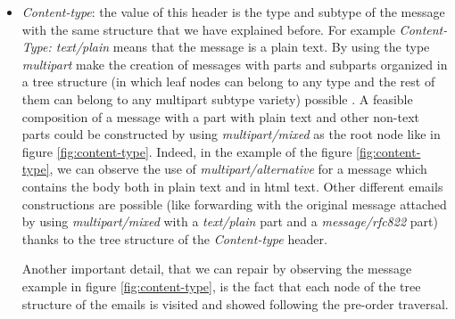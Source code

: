 \begin{itemize}
	\item\textit{Content-type}: the value of this header is the type and subtype of the message with the same structure that we have explained before. For example \textit{Content-Type: text/plain} means that the message is a plain text. By using the type \textit{multipart} make the creation of messages with parts and subparts organized in a tree structure (in which leaf nodes can belong to any type and the rest of them can belong to any multipart subtype variety) possible \citep[section 7.2]{rfc1341}. A feasible composition of a message with a part with plain text and other non-text parts could be constructed by using \textit{multipart/mixed} as the root node like in figure \ref{fig:content-type}. Indeed, in the example of the figure \ref{fig:content-type}, we can observe the use of \textit{multipart/alternative} for a message which contains the body both in plain text and in html text. Other different emails constructions are possible (like forwarding with the original message attached by using \textit{multipart/mixed} with a \textit{text/plain} part and a \textit{message/rfc822} part) thanks to the tree structure of the \textit{Content-type} header.
	
	Another important detail, that we can repair by observing the message example in figure \ref{fig:content-type}, is the fact that each node of the tree structure of the emails is visited and showed following the pre-order traversal.
	

\end{itemize}
